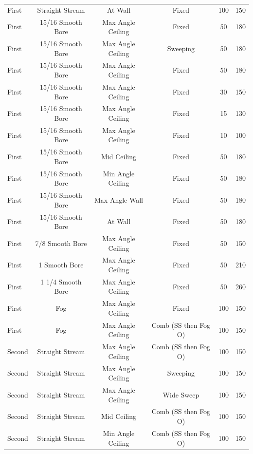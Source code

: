 \documentclass{article}
\begin{document}
\begin{table}[!ht]
\begin{tabular}{lccccc}
First  & Straight Stream    & At Wall              & Fixed      		& 100 & 150 \\
First  & 15/16 Smooth Bore  & Max Angle Ceiling      & Fixed         	& 50 & 180 \\
First  & 15/16 Smooth Bore  & Max Angle Ceiling      & Sweeping      	& 50 & 180 \\
First  & 15/16 Smooth Bore  & Max Angle Ceiling      & Fixed        	& 50 & 180 \\
First  & 15/16 Smooth Bore  & Max Angle Ceiling      & Fixed        	& 30 & 150 \\
First  & 15/16 Smooth Bore  & Max Angle Ceiling      & Fixed        	& 15 & 130 \\
First  & 15/16 Smooth Bore  & Max Angle Ceiling      & Fixed        	& 10 & 100 \\
First  & 15/16 Smooth Bore  & Mid Ceiling            & Fixed 			& 50 & 180 \\
First  & 15/16 Smooth Bore  & Min Angle Ceiling      & Fixed			& 50 & 180 \\
First  & 15/16 Smooth Bore  & Max Angle Wall         & Fixed			& 50 & 180 \\
First  & 15/16 Smooth Bore  & At Wall                & Fixed 			& 50 & 180 \\
First  & 7/8 Smooth Bore    & Max Angle Ceiling      & Fixed         	& 50 & 150 \\
First  & 1 Smooth Bore      & Max Angle Ceiling      & Fixed        	& 50 & 210 \\
First  & 1 1/4 Smooth Bore  & Max Angle Ceiling      & Fixed         	& 50 & 260 \\
First  & Fog                & Max Angle Ceiling      & Fixed        	& 100 & 150 \\
First  & Fog                & Max Angle Ceiling      & Comb (SS then Fog O) & 100 & 150 \\
\midrule
Second & Straight Stream    & Max Angle Ceiling      & Comb (SS then Fog O)    & 100 & 150 \\
Second & Straight Stream    & Max Angle Ceiling      & Sweeping                & 100 & 150 \\
Second & Straight Stream    & Max Angle Ceiling      & Wide Sweep              & 100 & 150 \\
Second & Straight Stream    & Mid Ceiling            & Comb (SS then Fog O)    & 100 & 150 \\
Second & Straight Stream    & Min Angle Ceiling      & Comb (SS then Fog O)    & 100 & 150 \\

\end{tabular}
\end{table}
\end{document}
